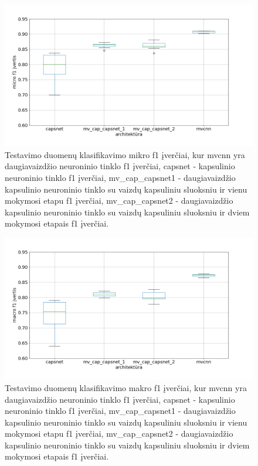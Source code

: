 \begin{figure}[H]
	\centering
	\includegraphics[scale=0.4]{img/boxplot_f1_micro.png}
	\caption{
		Testavimo duomenų klasifikavimo mikro f1 įverčiai, kur mvcnn yra daugiavaizdžio neuroninio tinklo f1 įverčiai, capsnet - kapsulinio neuroninio tinklo f1 įverčiai, mv\_cap\_capsnet1 - daugiavaizdžio kapsulinio neuroninio tinklo su vaizdų kapsuliniu sluoksniu ir vienu mokymosi etapu f1 įverčiai, mv\_cap\_capsnet2 - daugiavaizdžio kapsulinio neuroninio tinklo su vaizdų kapsuliniu sluoksniu ir dviem mokymosi etapais f1 įverčiai.
	}
	\label{img:box_micro_f1}
\end{figure}

\begin{figure}[H]
	\centering
	\includegraphics[scale=0.4]{img/boxplot_f1_macro.png}
	\caption{
		Testavimo duomenų klasifikavimo makro f1 įverčiai, kur mvcnn yra daugiavaizdžio neuroninio tinklo f1 įverčiai, capsnet - kapsulinio neuroninio tinklo f1 įverčiai, mv\_cap\_capsnet1 - daugiavaizdžio kapsulinio neuroninio tinklo su vaizdų kapsuliniu sluoksniu ir vienu mokymosi etapu f1 įverčiai, mv\_cap\_capsnet2 - daugiavaizdžio kapsulinio neuroninio tinklo su vaizdų kapsuliniu sluoksniu ir dviem mokymosi etapais f1 įverčiai.
	}
	\label{img:box_macro_f1}
\end{figure}
